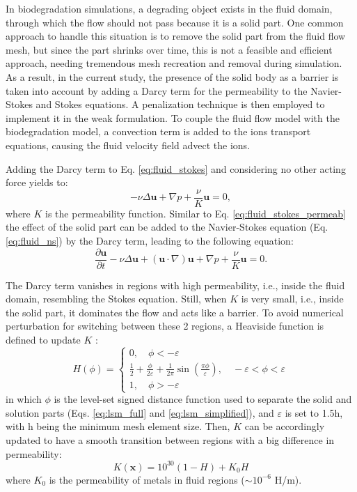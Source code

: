 In biodegradation simulations, a degrading object exists in the fluid domain, through which the flow should not pass because it is a solid part. One common approach to handle this situation is to remove the solid part from the fluid flow mesh, but since the part shrinks over time, this is not a feasible and efficient approach, needing tremendous mesh recreation and removal during simulation. As a result, in the current study, the presence of the solid body as a barrier is taken into account by adding a Darcy term for the permeability to the Navier-Stokes and Stokes equations. A penalization technique is then employed to implement it in the weak formulation. To couple the fluid flow model with the biodegradation model, a convection term is added to the ions transport equations, causing the fluid velocity field advect the ions.

Adding the Darcy  term to Eq. \ref{eq:fluid_stokes} and considering no other acting force yields to:
\begin{equation} \label{eq:fluid_stokes_permeab}
- \nu\Delta \mathbf{u} + \nabla p + \frac{\nu}{K} \mathbf{u} = 0,
\end{equation}
where $K$ is the permeability function.  Similar to Eq. \ref{eq:fluid_stokes_permeab} the effect of the solid part can be added to the Navier-Stokes equation (Eq. \ref{eq:fluid_ns}) by the Darcy term, leading to the following equation:
\begin{equation}  \label{eq:fluid_ns_permeab}
\frac{{\partial {\mathbf{u}}}}{{\partial t}} - \nu\Delta{\mathbf{u}} + \left( {{\mathbf{u}} \cdot \nabla } \right) {\mathbf{u}} + \nabla p + \frac{\nu}{K} \mathbf{u} = 0.
\end{equation}

The Darcy term vanishes in regions with high permeability, i.e., inside the fluid domain, resembling the Stokes equation. Still, when $K$ is very small, i.e., inside the solid part, it dominates the flow and acts like a barrier. To avoid numerical perturbation for switching between these 2 regions, a Heaviside function is defined to update $K$ \cite{Guyot2016}:
\begin{equation}
H(\phi)=\left\{\begin{array}{l}
0, \quad \phi<-\varepsilon \\
\frac{1}{2}+\frac{\phi}{2 \varepsilon}+\frac{1}{2 \pi} \sin \left(\frac{\pi \phi}{\varepsilon}\right), \quad-\varepsilon<\phi<\varepsilon \\
1, \quad \phi>-\varepsilon
\end{array}\right.
\end{equation}
in which $\phi$ is the level-set signed distance function used to separate the solid and solution parts (Eqs. \ref{eq:lsm_full} and \ref{eq:lsm_simplified}), and $\varepsilon$ is set to 1.5h, with h being the minimum mesh element size. Then, $K$ can be accordingly updated to have a smooth transition between regions with a big difference in permeability:
\begin{equation}
K(\boldsymbol{x})=10^{30}(1-H)+K_{0} H
\end{equation}
where $K_{0}$ is the permeability of metals in fluid regions ($\sim10^{-6}$ H/m).

